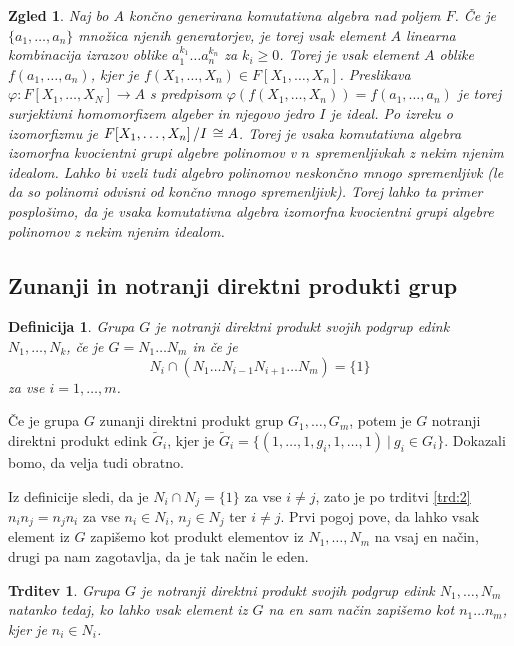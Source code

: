 \documentclass[10pt, a4paper]{article}
\newtheorem{trditev}[izr]{Trditev}
\newtheorem{defi}{Definicija}[section]
\newenvironment{noticeB}{%
  \tcolorbox[%
  notitle,
  empty,
  enhanced,  %
  breakable,
  coltext=black,
  colback=white, 
  fontupper=\rmfamily,
  parbox=false,
  noparskip,
  sharp corners,
  boxrule=-1pt,  %
  frame hidden,
  left=7pt,  %
  right=7pt,
  top=5pt,
  bottom=5pt,
  before skip=2.5ex plus 2pt,
  after skip=2.5ex plus 2pt,
  borderline west = {1.5pt}{-0.1pt}{blue!30!black}, %
  overlay unbroken and last={%
    \draw[color=black, line width=1.25pt]
    ($(frame.south west)+(1.pt, -0.1pt)$) -- ++(2em, 0);
  }
  ]}
{\endtcolorbox}
\newenvironment{definicija}{\begin{defi}\begin{noticeB}}{%
    \end{noticeB}\end{defi}}
\newtheorem{zgled}{Zgled}[section]
\newcommand{\quot}[2]{{\raisebox{0em}{$#1$}\left/\raisebox{0em}{$#2$}\right.}}
\begin{document}
\begin{zgled}
  Naj bo $A$ končno generirana komutativna algebra nad poljem $F$.
  Če je $\{a_1, \dots, a_n\}$ množica njenih generatorjev, je torej 
  vsak element $A$ linearna kombinacija izrazov oblike $a_1 ^{k_1} \dots a_n^{k_n}$ za 
  $k_i \geq 0$. Torej je vsak element $A$ oblike $f(a_1, \dots, a_n)$,
  kjer je $f(X_1, \dots, X_n) \in F[X_1, \dots, X_n]$.
  Preslikava $\varphi: F[X_1, \dots, X_N] \to A$
  s predpisom $\varphi (f(X_1, \dots, X_n)) = f(a_1, \dots, a_n)$ je torej surjektivni homomorfizem algeber in 
  njegovo jedro $I$ je ideal.
  Po izreku o izomorfizmu je $\quot{F[X_1, \dots, X_n]}{I} \cong A$.
  Torej je vsaka komutativna algebra izomorfna kvocientni grupi algebre polinomov v $n$ spremenljivkah
  z nekim njenim idealom. Lahko bi vzeli tudi algebro polinomov neskončno mnogo spremenljivk 
  (le da so polinomi odvisni od končno mnogo spremenljivk).
  Torej lahko ta primer posplošimo, da je vsaka komutativna algebra izomorfna kvocientni grupi 
  algebre polinomov z nekim njenim idealom.
\end{zgled}

\subsection{Zunanji in notranji direktni produkti grup}

\begin{definicija}
  Grupa $G$ je notranji direktni produkt svojih podgrup
  edink $N_1, \dots, N_k$, če je $G = N_1 \dots N_m$ in če je 
  $$N_i \cap (N_1 \dots N_{i - 1} N_{i + 1} \dots N_m) = \{1\}$$
  za vse $i = 1, \dots, m$.
\end{definicija}

Če je grupa $G$ zunanji direktni produkt grup $G_1, \dots, G_m$, potem je $G$ notranji direktni produkt edink $\tilde{G}_i$,
kjer je $\tilde{G}_i = \{(1, \dots, 1, g_i, 1, \dots, 1)\ |\ g_i \in G_i\}$.
Dokazali bomo, da velja tudi obratno.

Iz definicije sledi, da je $N_i \cap N_j = \{1\}$ za vse $i \neq j$, zato je 
po trditvi \ref{trd:2} $n_i n_j = n_j n_i$ za vse $n_i \in N_i$, $n_j \in N_j$ ter $i \neq j$.
Prvi pogoj pove, da lahko vsak element iz $G$ zapišemo kot produkt elementov 
iz $N_1, \dots, N_m$ na vsaj en način, drugi pa nam zagotavlja, da je tak način le eden.

\begin{trditev}
  Grupa $G$ je notranji direktni produkt svojih podgrup edink $N_1, \dots, N_m$ 
  natanko tedaj, ko lahko vsak element iz $G$ na en sam način zapišemo kot $n_1 \dots n_m$,
  kjer je $n_i \in N_i$.
\end{trditev}
\end{document}
